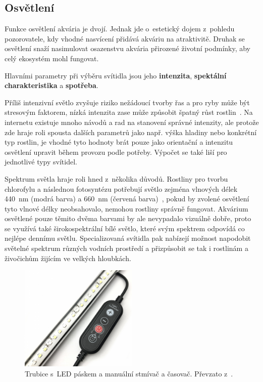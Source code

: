    \subsection{Osvětlení}
        Funkce osvětlení akvária je dvojí. Jednak jde o~estetický dojem z~pohledu pozorovatele, kdy vhodné nasvícení přidává akváriu na atraktivitě. Druhak se osvětlení snaží nasimulovat osazenstvu akvária přirozené životní podmínky, aby celý ekosystém mohl fungovat.

        Hlavními parametry při výběru svítidla jsou jeho \textbf{intenzita}, \textbf{spektální charakteristika} a \textbf{spotřeba}. 
        
        Příliš intenzivní světlo zvyšuje riziko nežádoucí tvorby řas a pro ryby může být stresovým faktorem, nízká intenzita zase může způsobit špatný růst rostlin~\cite{KejzlarRadim2022Ařpa}. Na internetu existuje mnoho návodů a rad na stanovení správné intenzity, ale protože zde hraje roli spousta dalších parametrů jako např. výška hladiny nebo konkrétní typ rostlin, je vhodné tyto hodnoty brát pouze jako orientační a intenzitu osvětlení upravit během provozu podle potřeby. Výpočet se také liší pro jednotlivé typy svítidel. 

        Spektrum světla hraje roli hned z~několika důvodů. Rostliny pro tvorbu chlorofylu a následnou fotosyntézu potřebují světlo zejména vlnových délek \qty{440}{nm} (modrá barva) a \qty{660}{nm} (červená barva)~\cite{eshop-ledsolution-svetlo}, pokud by zvolené osvětlení tyto vlnové délky neobsahovalo, nemohou rostliny správně fungovat. Akvárium osvětlené pouze těmito dvěma barvami by ale nevypadalo vizuálně dobře, proto se využívá také širokospektrální bílé světlo, které svým spektrem odpovídá co nejlépe dennímu světlu. 
        Specializovaná svítidla pak nabízejí možnost napodobit světelné spektrum různých vodních prostředí a přizpůsobit se tak i rostlinám a živočichům žijícím ve velkých hloubkách. 

 
        \begin{figure}[h!]
            \centering
            \includegraphics[width=0.5\textwidth]{obrazky/osvetleni/stmivac.jpg}
            \caption{Trubice s~LED páskem a manuální stmívač a časovač. Převzato z~\cite{eshop-rostlinna-akvaria}.}
            \label{fig:obrazky-osvetleni-stmivac-jpg}
        \end{figure}

